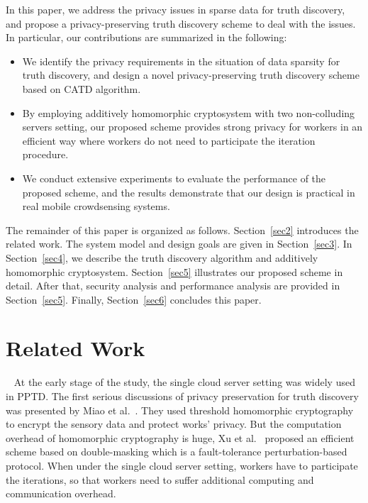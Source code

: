 \documentclass[conference]{IEEEtran}
\begin{document}
In this paper, we address the privacy issues in sparse data for truth discovery, and propose a privacy-preserving truth discovery scheme to deal with the issues.
In particular, our contributions are summarized in the following:
\begin{itemize}
  \item We identify the privacy requirements in the situation of data sparsity for truth discovery, and design a novel privacy-preserving truth discovery scheme based on CATD algorithm.
  \item By employing additively homomorphic cryptosystem with two non-colluding
servers setting, our proposed scheme provides strong privacy for workers in an efficient way where workers do not need to participate the iteration procedure.
  \item We conduct extensive experiments to evaluate the performance of the proposed scheme, and the results demonstrate that our design is practical in real mobile crowdsensing systems.
\end{itemize}

The remainder of this paper is organized as follows.
Section~\ref{sec2} introduces the related work.
The system model and design goals are given in Section~\ref{sec3}.
In Section~\ref{sec4}, we describe the truth discovery algorithm and additively homomorphic cryptosystem.
Section~\ref{sec5} illustrates our proposed scheme in detail.
After that, security analysis and performance analysis are provided in Section~\ref{sec5}.
Finally, Section~\ref{sec6} concludes this paper.

\section{Related Work}~\label{sec2}
At the early stage of the study, the single cloud server setting was widely used in PPTD.
The first serious discussions of privacy preservation for truth discovery was presented by Miao et al.~\cite{miao_cloud-enabled_2015}.
They used threshold homomorphic cryptography to encrypt the sensory data and protect works' privacy. 
But the computation overhead of homomorphic cryptography is huge, Xu et al.~\cite{xu_efficient_2019} proposed an efficient scheme based on double-masking which is a fault-tolerance perturbation-based protocol.
When under the single cloud server setting, workers have to participate the iterations, so that workers need to suffer additional computing and communication overhead.
\end{document}
